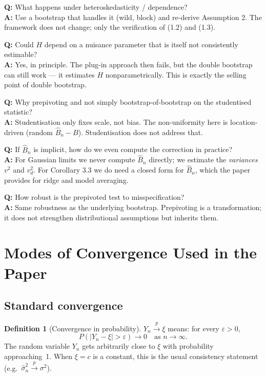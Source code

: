 \documentclass[11pt]{article}
\theoremstyle{definition}
\newtheorem*{definition}{Definition}
\newcommand{\Bnh}{\hat{B}_{n}}
\newcommand{\Q}[2]{\noindent\textcolor{warn}{\textbf{Q:}} #1\\ \textcolor{accent}{\textbf{A:}} #2\par\smallskip}
\begin{document}
\Q{What happens under heteroskedasticity / dependence?}
{Use a bootstrap that handles it (wild, block) and re-derive Assumption 2.
The framework does not change; only the verification of (1.2) and (1.3).}

\Q{Could $H$ depend on a nuisance parameter that is itself not consistently estimable?}
{Yes, in principle. The plug-in approach then fails, but the double bootstrap
can still work --- it estimates $H$ nonparametrically. This is exactly the
selling point of double bootstrap.}

\Q{Why prepivoting and not simply bootstrap-of-bootstrap on the studentised statistic?}
{Studentisation only fixes scale, not bias. The non-uniformity here is
location-driven (random $\Bnh-B$). Studentisation does not address that.}

\Q{If $\Bnh$ is implicit, how do we even compute the correction in practice?}
{For Gaussian limits we never compute $\Bnh$ directly; we estimate the
\emph{variances} $v^2$ and $v_d^2$. For Corollary 3.3 we do need a closed
form for $\Bnh$, which the paper provides for ridge and model averaging.}

\Q{How robust is the prepivoted test to misspecification?}
{Same robustness as the underlying bootstrap. Prepivoting is a transformation;
it does not strengthen distributional assumptions but inherits them.}




\section{Modes of Convergence Used in the Paper}
 
\subsection{Standard convergence}
 
\begin{definition}[Convergence in probability]
  $Y_n \xrightarrow{p} \xi$ means: for every $\varepsilon > 0$,
  \[
    P(|Y_n - \xi| > \varepsilon) \to 0 \quad\text{as } n \to \infty.
  \]
  The random variable $Y_n$ gets arbitrarily close to $\xi$ with
  probability approaching~1. When $\xi = c$ is a constant, this is the
  usual consistency statement (e.g.\ $\hat\sigma^2_n \xrightarrow{p} \sigma^2$).
\end{definition}
 
\end{document}
